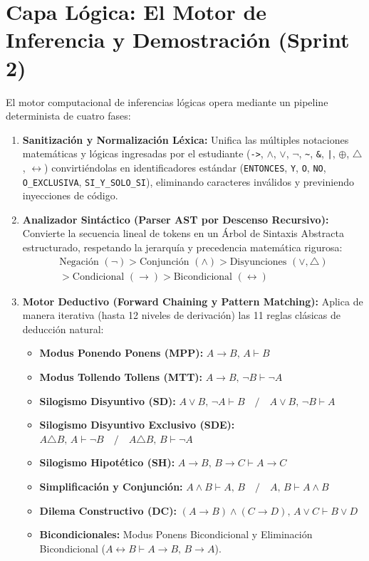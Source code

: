 \documentclass[11pt,a4paper]{article}
\begin{document}
\section{Capa Lógica: El Motor de Inferencia y Demostración (Sprint 2)}

El motor computacional de inferencias lógicas opera mediante un pipeline determinista de cuatro fases:

\begin{enumerate}[label=\textbf{Fase \arabic*:}]
    \item \textbf{Sanitización y Normalización Léxica:}
    Unifica las múltiples notaciones matemáticas y lógicas ingresadas por el estudiante (\texttt{->}, \texttt{$ \land $}, \texttt{$ \lor $}, \texttt{$ \lnot $}, \texttt{\~}, \texttt{\&}, \texttt{|}, \texttt{$ \oplus $}, \texttt{$ \triangle $}, \texttt{$ \leftrightarrow $}) convirtiéndolas en identificadores estándar (\texttt{ENTONCES}, \texttt{Y}, \texttt{O}, \texttt{NO}, \texttt{O\_EXCLUSIVA}, \texttt{SI\_Y\_SOLO\_SI}), eliminando caracteres inválidos y previniendo inyecciones de código.

    \item \textbf{Analizador Sintáctico (Parser AST por Descenso Recursivo):}
    Convierte la secuencia lineal de tokens en un Árbol de Sintaxis Abstracta estructurado, respetando la jerarquía y precedencia matemática rigurosa:
  \begin{gather*}
\text{Negación } (\neg) > \text{Conjunción } (\land) > \text{Disyunciones } (\lor, \triangle) \\
> \text{Condicional } (\to) > \text{Bicondicional } (\leftrightarrow)
\end{gather*}

    \item \textbf{Motor Deductivo (Forward Chaining y Pattern Matching):}
    Aplica de manera iterativa (hasta 12 niveles de derivación) las 11 reglas clásicas de deducción natural:
    \begin{itemize}[leftmargin=0.8cm]
        \item \textbf{Modus Ponendo Ponens (MPP):} $A \to B, \, A \vdash B$
        \item \textbf{Modus Tollendo Tollens (MTT):} $A \to B, \, \neg B \vdash \neg A$
        \item \textbf{Silogismo Disyuntivo (SD):} $A \lor B, \, \neg A \vdash B \quad / \quad A \lor B, \, \neg B \vdash A$
        \item \textbf{Silogismo Disyuntivo Exclusivo (SDE):} $A \triangle B, \, A \vdash \neg B \quad / \quad A \triangle B, \, B \vdash \neg A$
        \item \textbf{Silogismo Hipotético (SH):} $A \to B, \, B \to C \vdash A \to C$
        \item \textbf{Simplificación y Conjunción:} $A \land B \vdash A, \, B \quad / \quad A, \, B \vdash A \land B$
        \item \textbf{Dilema Constructivo (DC):} $(A \to B) \land (C \to D), \, A \lor C \vdash B \lor D$
        \item \textbf{Bicondicionales:} Modus Ponens Bicondicional y Eliminación Bicondicional ($A \leftrightarrow B \vdash A \to B, \, B \to A$).
    \end{itemize}


\end{enumerate}
\end{document}
